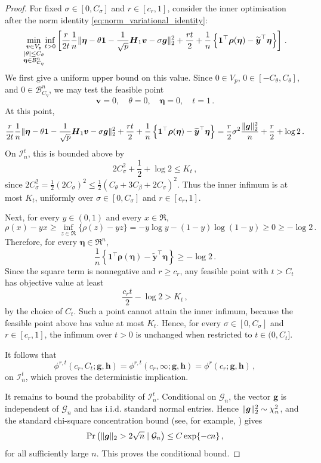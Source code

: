 \documentclass{article}
\makeatletter
\theoremstyle{definition}
\newcommand{\vnorm}[1]{%
	\ensuremath{%
		\if@display
		\left\| #1 \right\|
		\else
		\| #1 \|
		\fi
	}%
}
\newcommand{\abs}[1]{%
	\ensuremath{%
		\if@display
		\left| #1 \right|
		\else
		\lvert #1 \rvert
		\fi
	}%
}
\newcommand*{\bb}{\boldsymbol}
\def\bH {\bb{H}}
\def\bv{\bb{v}}
\def\bh{\bb{h}}
\def\bg{\bb{g}}
\def\bYtil{\widetilde{\bb{y}}}
\def\bH{\bb{H}}
\makeatother
\begin{document}
\begin{bibunit}
\begin{proof}
	For fixed $\sigma\in[0,C_\sigma]$ and $r\in[c_r,1]$, consider the inner optimisation after the norm identity \eqref{eq:norm_variational_identity}:
	$$
		\underset{\substack{\bv\in V_p\\
		\abs{\theta}\leq C_\theta\\
		\bb\eta\in\mathcal B^n_{C_\eta}}}{\min}
		\underset{t>0}{\inf}
		\left[
			\frac{r}{2t}
			\frac1n
			\vnorm{
				\bb\eta-\theta\bb1-\frac1{\sqrt p}\bH_1\bv-\sigma\bg
			}_2^2
			+
			\frac{rt}{2}
			+
			\frac1n
			\left\{
				\bb1^\top\bb\rho(\bb\eta)-\bYtil^\top\bb\eta
			\right\}
		\right]\,.
	$$
	We first give a uniform upper bound on this value. Since $0\in V_p$, $0\in[-C_\theta,C_\theta]$, and $0\in\mathcal B^n_{C_\eta}$, we may test the feasible point
	$$
		\bv=0,\quad \theta=0,\quad \bb\eta=0,\quad t=1\,.
	$$
	At this point,
	$$
		\frac{r}{2t}
		\frac1n
		\vnorm{
			\bb\eta-\theta\bb1-\frac1{\sqrt p}\bH_1\bv-\sigma\bg
		}_2^2
		+
		\frac{rt}{2}
		+
		\frac1n
		\left\{
			\bb1^\top\bb\rho(\bb\eta)-\bYtil^\top\bb\eta
		\right\}
		=
		\frac r2\sigma^2\frac{\vnorm{\bg}_2^2}{n}
		+
		\frac r2
		+
		\log 2\,.
	$$
	On $\mathcal I_n^t$, this is bounded above by
	$$
		2C_\sigma^2
		+
		\frac12
		+
		\log 2
		\leq
		K_t\,,
	$$
	since $2C_\sigma^2=\tfrac12(2C_\sigma)^2\leq\tfrac12(C_\theta+3C_\beta+2C_\sigma)^2$.
	Thus the inner infimum is at most $K_t$, uniformly over $\sigma\in[0,C_\sigma]$ and $r\in[c_r,1]$.

	Next, for every $y\in(0,1)$ and every $x\in\Re$,
	$$
		\rho(x)-yx\geq
		\underset{z\in\Re}{\inf}\{\rho(z)-yz\}
		=
		-y\log y-(1-y)\log(1-y)
		\geq
		0
		\geq
		-\log 2\,.
	$$
	Therefore, for every $\bb\eta\in\Re^n$,
	$$
		\frac1n
		\left\{
			\bb1^\top\bb\rho(\bb\eta)-\bYtil^\top\bb\eta
		\right\}
		\geq
		-\log 2\,.
	$$
	Since the square term is nonnegative and $r\geq c_r$, any feasible point with $t>C_t$ has objective value at least
	$$
		\frac{c_rt}{2}-\log 2
		>
		K_t\,,
	$$
	by the choice of $C_t$. Such a point cannot attain the inner infimum, because the feasible point above has value at most $K_t$. Hence, for every $\sigma\in[0,C_\sigma]$ and $r\in[c_r,1]$, the infimum over $t>0$ is unchanged when restricted to $t\in(0,C_t]$.

	It follows that
	$$
		\phi^{r,t}(c_r,C_t;\bg,\bh)
		=
		\phi^{r,t}(c_r,\infty;\bg,\bh)
		=
		\phi^r(c_r;\bg,\bh)\,,
	$$
	on $\mathcal I_n^t$, which proves the deterministic implication.

	It remains to bound the probability of $\mathcal I_n^t$. Conditional on $\mathcal G_n$, the vector $\bg$ is independent of $\mathcal G_n$ and has i.i.d. standard normal entries. Hence $\vnorm{\bg}_2^2\sim\chi_n^2$, and the standard chi-square concentration bound
	(see, for example, \citealt[][Theorem~3.1.1]{vershynin:2018}) gives
	$$
		\Pr\left(
			\vnorm{\bg}_2>2\sqrt n
			\mid
			\mathcal G_n
		\right)
		\leq
		C\exp\{-cn\}\,,
	$$
	for all sufficiently large $n$. This proves the conditional bound.
\end{proof}


\end{bibunit}
\end{document}

